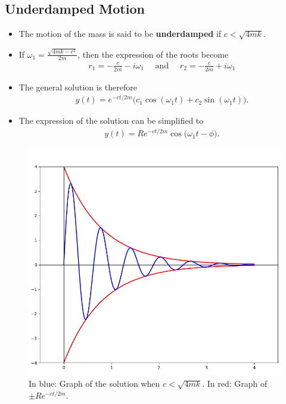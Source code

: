\documentclass[12pt,a4paper]{article}
\begin{document}
	\subsection{Underdamped Motion}
	\begin{itemize}
	\item The motion of the mass is said to be  \textbf{underdamped} if $c < \sqrt{4mk}$.
	
	\item If $\omega_1 = \frac{\sqrt{4mk - c^2}}{2m}$, then the expression of the roots become
		\begin{align*}
		r_1 = -\frac{c}{2m} - i \omega_1 \quad \text{ and } \quad r_2 = -\frac{c}{2m} + i \omega_1
		\end{align*}
	
	
	\item The general solution is therefore
		\begin{align*}
		y (t)= e^{-ct/2m} \big( c_1 \cos (\omega_1 t) + c_2 \sin (\omega_1 t) \big) .
		\end{align*}
	
	\item The expression of the solution can be simplified to%
		\begin{align*}
		y(t) = R e^{-ct/2m} \cos \big( \omega_1 t - \phi \big) .
		\end{align*}
	
	\end{itemize}
	
	\begin{figure}[h]
	\centering
	\includegraphics[scale=0.3625]{fig4.png}
	\caption{In blue: Graph of the solution when $c < \sqrt{4mk}$. In red: Graph of $\pm Re^{-ct/2m}$.}
	\end{figure}
	
\end{document}

